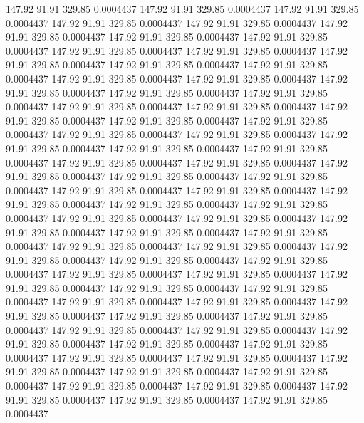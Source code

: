  147.92   91.91  329.85   0.0004437
 147.92   91.91  329.85   0.0004437
 147.92   91.91  329.85   0.0004437
 147.92   91.91  329.85   0.0004437
 147.92   91.91  329.85   0.0004437
 147.92   91.91  329.85   0.0004437
 147.92   91.91  329.85   0.0004437
 147.92   91.91  329.85   0.0004437
 147.92   91.91  329.85   0.0004437
 147.92   91.91  329.85   0.0004437
 147.92   91.91  329.85   0.0004437
 147.92   91.91  329.85   0.0004437
 147.92   91.91  329.85   0.0004437
 147.92   91.91  329.85   0.0004437
 147.92   91.91  329.85   0.0004437
 147.92   91.91  329.85   0.0004437
 147.92   91.91  329.85   0.0004437
 147.92   91.91  329.85   0.0004437
 147.92   91.91  329.85   0.0004437
 147.92   91.91  329.85   0.0004437
 147.92   91.91  329.85   0.0004437
 147.92   91.91  329.85   0.0004437
 147.92   91.91  329.85   0.0004437
 147.92   91.91  329.85   0.0004437
 147.92   91.91  329.85   0.0004437
 147.92   91.91  329.85   0.0004437
 147.92   91.91  329.85   0.0004437
 147.92   91.91  329.85   0.0004437
 147.92   91.91  329.85   0.0004437
 147.92   91.91  329.85   0.0004437
 147.92   91.91  329.85   0.0004437
 147.92   91.91  329.85   0.0004437
 147.92   91.91  329.85   0.0004437
 147.92   91.91  329.85   0.0004437
 147.92   91.91  329.85   0.0004437
 147.92   91.91  329.85   0.0004437
 147.92   91.91  329.85   0.0004437
 147.92   91.91  329.85   0.0004437
 147.92   91.91  329.85   0.0004437
 147.92   91.91  329.85   0.0004437
 147.92   91.91  329.85   0.0004437
 147.92   91.91  329.85   0.0004437
 147.92   91.91  329.85   0.0004437
 147.92   91.91  329.85   0.0004437
 147.92   91.91  329.85   0.0004437
 147.92   91.91  329.85   0.0004437
 147.92   91.91  329.85   0.0004437
 147.92   91.91  329.85   0.0004437
 147.92   91.91  329.85   0.0004437
 147.92   91.91  329.85   0.0004437
 147.92   91.91  329.85   0.0004437
 147.92   91.91  329.85   0.0004437
 147.92   91.91  329.85   0.0004437
 147.92   91.91  329.85   0.0004437
 147.92   91.91  329.85   0.0004437
 147.92   91.91  329.85   0.0004437
 147.92   91.91  329.85   0.0004437
 147.92   91.91  329.85   0.0004437
 147.92   91.91  329.85   0.0004437
 147.92   91.91  329.85   0.0004437
 147.92   91.91  329.85   0.0004437
 147.92   91.91  329.85   0.0004437
 147.92   91.91  329.85   0.0004437
 147.92   91.91  329.85   0.0004437
 147.92   91.91  329.85   0.0004437
 147.92   91.91  329.85   0.0004437
 147.92   91.91  329.85   0.0004437
 147.92   91.91  329.85   0.0004437
 147.92   91.91  329.85   0.0004437
 147.92   91.91  329.85   0.0004437
 147.92   91.91  329.85   0.0004437
 147.92   91.91  329.85   0.0004437
 147.92   91.91  329.85   0.0004437
